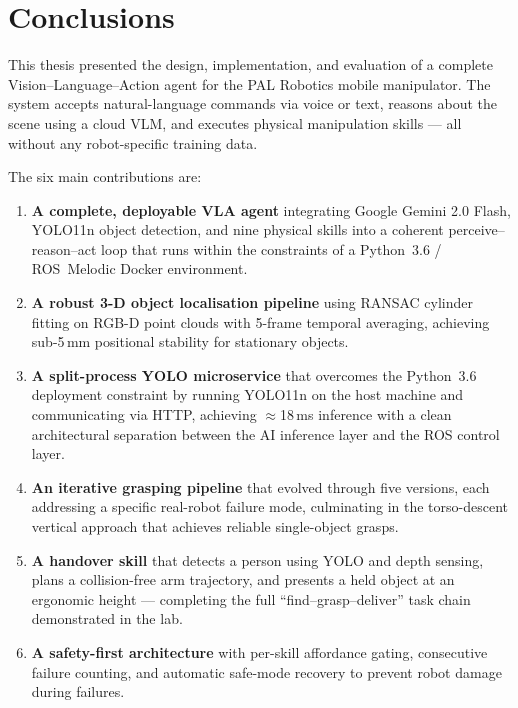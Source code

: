 \section{Conclusions}
\label{sec:conclusions}

This thesis presented the design, implementation, and evaluation of a complete
Vision--Language--Action agent for the PAL Robotics \tiago{} mobile manipulator.
The system accepts natural-language commands via voice or text, reasons about the scene
using a cloud VLM, and executes physical manipulation skills --- all without any
robot-specific training data.

The six main contributions are:

\begin{enumerate}

  \item \textbf{A complete, deployable VLA agent} integrating Google Gemini 2.0 Flash,
        YOLO11n object detection, and nine physical skills into a coherent
        perceive--reason--act loop that runs within the constraints of a Python~3.6
        / ROS~Melodic Docker environment.

  \item \textbf{A robust 3-D object localisation pipeline} using RANSAC cylinder fitting
        on RGB-D point clouds with 5-frame temporal averaging, achieving sub-5\,mm
        positional stability for stationary objects.

  \item \textbf{A split-process YOLO microservice} that overcomes the Python~3.6
        deployment constraint by running YOLO11n on the host machine and communicating
        via HTTP, achieving $\approx$18\,ms inference with a clean architectural separation
        between the AI inference layer and the ROS control layer.

  \item \textbf{An iterative grasping pipeline} that evolved through five versions, each
        addressing a specific real-robot failure mode, culminating in the torso-descent
        vertical approach that achieves reliable single-object grasps.

  \item \textbf{A handover skill} that detects a person using YOLO and depth sensing,
        plans a collision-free arm trajectory, and presents a held object at an ergonomic
        height --- completing the full ``find--grasp--deliver'' task chain demonstrated in
        the lab.

  \item \textbf{A safety-first architecture} with per-skill affordance gating, consecutive
        failure counting, and automatic safe-mode recovery to prevent robot damage during
        failures.

\end{enumerate}

